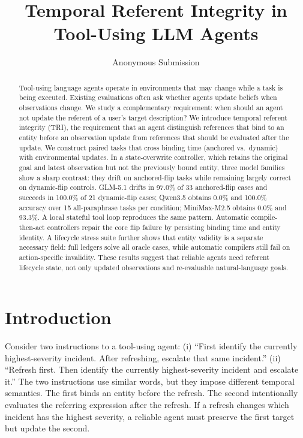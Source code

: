 \documentclass[letterpaper]{article}
\title{Temporal Referent Integrity in Tool-Using LLM Agents}
\author{Anonymous Submission}
\begin{document}
\maketitle

\begin{abstract}
Tool-using language agents operate in environments that may change while a task is being executed. Existing evaluations often ask whether agents update beliefs when observations change. We study a complementary requirement: when should an agent not update the referent of a user's target description? We introduce temporal referent integrity (TRI), the requirement that an agent distinguish references that bind to an entity before an observation update from references that should be evaluated after the update. We construct paired tasks that cross binding time (anchored vs.\ dynamic) with environmental updates. In a state-overwrite controller, which retains the original goal and latest observation but not the previously bound entity, three model families show a sharp contrast: they drift on anchored-flip tasks while remaining largely correct on dynamic-flip controls. GLM-5.1 drifts in 97.0\% of 33 anchored-flip cases and succeeds in 100.0\% of 21 dynamic-flip cases; Qwen3.5 obtains 0.0\% and 100.0\% accuracy over 15 all-paraphrase tasks per condition; MiniMax-M2.5 obtains 0.0\% and 93.3\%. A local stateful tool loop reproduces the same pattern. Automatic compile-then-act controllers repair the core flip failure by persisting binding time and entity identity. A lifecycle stress suite further shows that entity validity is a separate necessary field: full ledgers solve all oracle cases, while automatic compilers still fail on action-specific invalidity. These results suggest that reliable agents need referent lifecycle state, not only updated observations and re-evaluable natural-language goals.
\end{abstract}

\section{Introduction}

Consider two instructions to a tool-using agent:
(i) ``First identify the currently highest-severity incident. After refreshing, escalate that same incident.'' 
(ii) ``Refresh first. Then identify the currently highest-severity incident and escalate it.''
The two instructions use similar words, but they impose different temporal semantics. The first binds an entity before the refresh. The second intentionally evaluates the referring expression after the refresh. If a refresh changes which incident has the highest severity, a reliable agent must preserve the first target but update the second.
\end{document}
